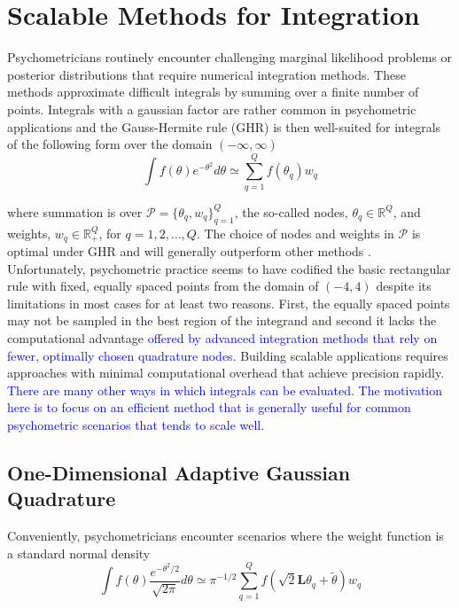 \documentclass[12pt]{article}
\begin{document}
\section*{Scalable Methods for Integration}

Psychometricians routinely encounter challenging marginal likelihood problems or posterior distributions that require numerical integration methods. These methods approximate difficult integrals by summing over a finite number of points. Integrals with a gaussian factor are rather common in psychometric applications and the Gauss-Hermite rule (GHR) is then well-suited for integrals of the following form over the domain $(-\infty,\infty)$
\begin{equation}
\label{eqn:integral}
\int f(\theta)e^{-\theta^2} d\theta \simeq \sum_{q=1}^Q f(\theta_q)w_q
\end{equation}

\noindent where summation is over $\mathcal{P}=\{\theta_q,w_q\}^Q_{q=1}$, the so-called nodes, $\theta_q \in \mathbb{R}^Q$, and weights, $w_q \in \mathbb{R}_+^Q$, for $q = 1,2, \ldots, Q$. The choice of nodes and weights in $\mathcal{P}$ is optimal under GHR and will generally outperform other methods \cite{Quarteroni}. Unfortunately, psychometric practice seems to have codified the basic rectangular rule with fixed, equally spaced points from the domain of $(-4,4)$ \cite{bock:eap} despite its limitations in most cases for at least two reasons. First, the equally spaced points may not be sampled in the best region of the integrand and second it lacks the computational advantage \textcolor{blue}{offered by advanced integration methods that rely on fewer, optimally chosen quadrature nodes}. Building scalable applications requires approaches with minimal computational overhead that achieve precision rapidly. \textcolor{blue}{There are many other ways in which integrals can be evaluated. The motivation here is to focus on an efficient method that is generally useful for common psychometric scenarios that tends to scale well.}

\subsection*{One-Dimensional Adaptive Gaussian Quadrature}

Conveniently, psychometricians encounter scenarios where the weight function is a standard normal density
\begin{equation}
\label{eqn:integralApprox2}
\int f(\theta)\frac{e^{-\theta^2/2}}{\sqrt{2\pi}} d\theta \simeq \pi^{-1/2}\sum_{q=1}^Q f(\sqrt{2}\bm{L}\theta_q+\widetilde{\theta})w_q
\end{equation}
\end{document}
